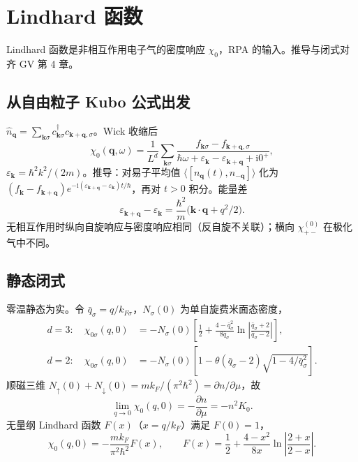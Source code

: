 \section{Lindhard 函数}

Lindhard 函数是非相互作用电子气的密度响应 $\chi_0$，RPA 的输入。推导与闭式对齐 GV 第 4 章。

\subsection{从自由粒子 Kubo 公式出发}

$\hat n_{\mathbf{q}}=\sum_{\mathbf{k}\sigma}c_{\mathbf{k}\sigma}^\dagger c_{\mathbf{k}+\mathbf{q},\sigma}$。Wick 收缩后
\begin{equation}
  \chi_0(\mathbf{q},\omega)
  =\frac{1}{L^d}
  \sum_{\mathbf{k}\sigma}
  \frac{f_{\mathbf{k}\sigma}-f_{\mathbf{k}+\mathbf{q},\sigma}}
  {\hbar\omega+\varepsilon_{\mathbf{k}}-\varepsilon_{\mathbf{k}+\mathbf{q}}+\mathrm{i}0^+},
\label{eq:lindhard_def}
\end{equation}
$\varepsilon_{\mathbf{k}}=\hbar^2k^2/(2m)$。推导：对易子平均值 $\langle[n_{\mathbf{q}}(t),n_{-\mathbf{q}}]\rangle$ 化为 $(f_{\mathbf{k}}-f_{\mathbf{k}+\mathbf{q}})e^{-\mathrm{i}(\varepsilon_{\mathbf{k}+\mathbf{q}}-\varepsilon_{\mathbf{k}})t/\hbar}$，再对 $t>0$ 积分。能量差
\begin{equation}
  \varepsilon_{\mathbf{k}+\mathbf{q}}-\varepsilon_{\mathbf{k}}
  =\frac{\hbar^2}{m}
  \bigl(\mathbf{k}\cdot\mathbf{q}+q^2/2\bigr).
\end{equation}
无相互作用时纵向自旋响应与密度响应相同（反自旋不关联）；横向 $\chi_{+-}^{(0)}$ 在极化气中不同。

\subsection{静态闭式}

零温静态为实。令 $\bar q_\sigma=q/k_{F\sigma}$，$N_\sigma(0)$ 为单自旋费米面态密度，
\begin{equation}
\begin{aligned}
  d=3:\quad
  \chi_{0\sigma}(q,0)
  &=-N_\sigma(0)
  \left[
  \frac12+\frac{4-\bar q_\sigma^2}{8\bar q_\sigma}
  \ln\left|\frac{\bar q_\sigma+2}{\bar q_\sigma-2}\right|
  \right],\\
  d=2:\quad
  \chi_{0\sigma}(q,0)
  &=-N_\sigma(0)
  \left[
  1-\theta(\bar q_\sigma-2)
  \sqrt{1-4/\bar q_\sigma^2}
  \right].
\end{aligned}
\label{eq:chi0_static}
\end{equation}
顺磁三维 $N_\uparrow(0)+N_\downarrow(0)=mk_F/(\pi^2\hbar^2)=\partial n/\partial\mu$，故
\begin{equation}
  \lim_{q\to0}\chi_0(q,0)
  =-\frac{\partial n}{\partial\mu}
  =-n^2 K_0.
\label{eq:chi0_q0}
\end{equation}
无量纲 Lindhard 函数 $F(x)$（$x=q/k_F$）满足 $F(0)=1$，
\begin{equation}
  \chi_0(q,0)
  =-\frac{m k_F}{\pi^2\hbar^2}F(x),
  \qquad
  F(x)
  =\frac12+\frac{4-x^2}{8x}\ln\left|\frac{2+x}{2-x}\right|.
\label{eq:Fstd}
\end{equation}

